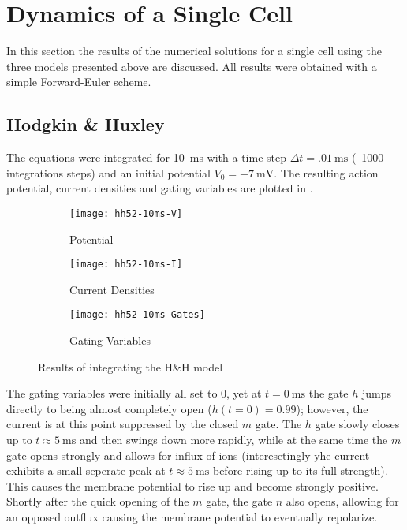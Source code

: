 \section{Dynamics of a Single Cell}
In this section the results of the numerical solutions for a single cell
using the three models presented above are discussed. All results were
obtained with a simple Forward-Euler scheme.


\subsection{Hodgkin \& Huxley}
The equations were integrated for \SI{10}{\milli\second} with a time step
$\Delta{t}=\SI{.01}{\milli\second}$ (\ie~1000 integrations steps) and an
initial potential $V_0=\SI{-7}{\milli\volt}$. The resulting action potential,
current densities and gating variables are plotted in .

\begin{figure}[h]
    \centering
    \begin{subfigure}[h]{.3\textwidth}
        \texttt{[image: hh52-10ms-V]}
        \vspace{-\baselineskip}
        \label{fig:hh1V}
        \caption{Potential}
    \end{subfigure}
    \begin{subfigure}[h]{.3\textwidth}
        \texttt{[image: hh52-10ms-I]}
        \vspace{-\baselineskip}
        \label{fig:hh1I}
        \caption{Current Densities}
    \end{subfigure}
    \begin{subfigure}[h]{.3\textwidth}
        \texttt{[image: hh52-10ms-Gates]}
        \vspace{-\baselineskip}
        \label{fig:hh1Gates}
        \caption{Gating Variables}
    \end{subfigure}
    \label{fig:hh1}
    \caption{Results of integrating the H\&H model}
\end{figure}

The gating variables were initially all set to 0, yet at
$t=\SI{0}{\milli\second}$ the  gate $h$ jumps directly to being almost
completely open ($h(t=0)=0.99$); however, the  current is at this point
suppressed by the closed $m$ gate. The $h$ gate slowly closes up to
$t\approx\SI{5}{\milli\second}$ and then swings down more rapidly, while at the same
time the $m$ gate opens strongly and allows for influx of  ions
(interesetingly yhe  current exhibits a small seperate peak at
$t\approx\SI{5}{\milli\second}$ before rising up to its full strength). This
causes the membrane potential to rise up and become strongly positive. Shortly
after the quick opening of the $m$ gate, the  gate $n$ also opens,
allowing for an opposed  outflux causing the membrane potential to
eventually repolarize.

